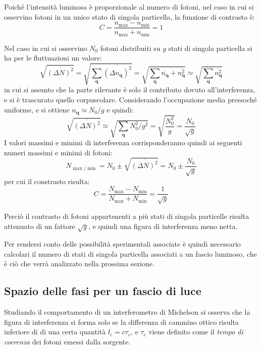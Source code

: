 Poiché l'intensità luminosa è proporzionale al numero di fotoni, nel caso in cui si osservino fotoni in un unico stato di singola particella, la funzione di contrasto è:
\begin{equation*}
C = \frac{n_{\max} - n_{\min}}{n_{\max} + n_{\min}} = 1
\end{equation*}
\newline

Nel caso in cui si osservino $ N_0 $ fotoni distribuiti su $ g $ stati di singola particella si ha per le fluttuazioni un valore:
\[ \sqrt{\overline{(\Delta N)^2}} = \sqrt{\sum_{\textbf{q}} \overline{(\Delta n_{\textbf{q}})^2}} = \sqrt{\sum_{\textbf{q}} \overline{n_{\textbf{q}}} +  \overline{n_{\textbf{q}}^2}} \simeq \sqrt{\sum_{\textbf{q}}  \overline{n_{\textbf{q}}^2}} \]
in cui si assunto che la parte rilevante è solo il contributo dovuto all'interferenza, e si è trascurato quello corpuscolare. Considerando l'occupazione media pressoché uniforme, e si ottiene $ n_{\textbf{q}} \simeq N_0/g$ e quindi:
\[  \sqrt{\overline{(\Delta N)^2}} \simeq \sqrt{\sum_{\textbf{q}}  N_0^2/g^2} = \sqrt{\frac{N_0^2}{g}} = \frac{N_0}{\sqrt{g}} \]
I valori massimi e minimi di interferenza corrisponderanno quindi ai seguenti numeri massimi e minimi di fotoni:
\[  N_{\max/\min} = N_0 \pm \sqrt{\overline{(\Delta N)^2}} = N_0 \pm \frac{N_0}{\sqrt{g}} \]
per cui il constrasto risulta:
\[ C = \frac{N_{\max} - N_{\min}}{N_{\max} + N_{\min}} = \frac{1}{\sqrt{g}}\]

Perciò il contrasto di fotoni appartenenti a più stati di singola particelle risulta attenuato di un fattore $ \sqrt{g} $, e quindi una figura di interferenza meno netta.

Per rendersi conto delle possibilità sperimentali associate è quindi necessario calcolari il numero di stati di singola particella associati a un fascio luminoso, che è ciò che verrà analizzato nella prossima sezione.

\subsection{Spazio delle fasi per un fascio di luce}

Studiando il comportamento di un interferometro di Michelson si osserva che la figura di interferenza si forma solo se la differenza di cammino ottico risulta inferiore di di una certa quantità $ l_c = c \tau_c $, e $ \tau_c $  viene definito come il \textit{tempo di coerenza} dei fotoni emessi dalla sorgente.

